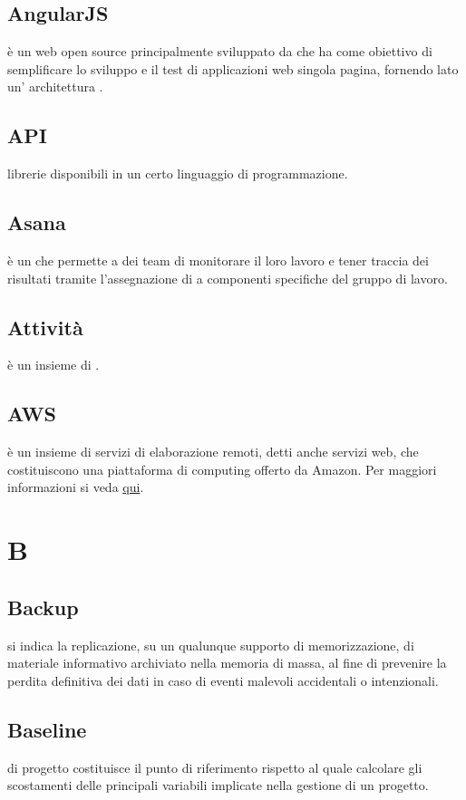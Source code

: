 \documentclass[12pt,a4paper]{article}
\begin{document}
\subsection{AngularJS}
è un  web open source principalmente sviluppato da  che ha come obiettivo di semplificare lo sviluppo e il test di applicazioni web singola pagina, fornendo lato  un' architettura .

\subsection{API}
librerie  disponibili in un certo linguaggio di programmazione.

\subsection{Asana}
è un  che permette a dei team di monitorare il loro lavoro e tener traccia dei risultati tramite l'assegnazione di  a componenti specifiche del gruppo di lavoro.

\subsection{Attività}
è un insieme di .

\subsection{AWS}
è un insieme di servizi di elaborazione remoti, detti anche servizi web, che costituiscono una piattaforma di computing offerto da Amazon. Per maggiori informazioni si veda \href{https://aws.amazon.com/it/}{qui}.


\newpage

\section{B}


\subsection{Backup}
si indica la replicazione, su un qualunque supporto di memorizzazione, di materiale informativo archiviato nella memoria di massa, al fine di prevenire la perdita definitiva dei dati in caso di eventi malevoli accidentali o intenzionali.

\subsection{Baseline}
 di progetto costituisce il punto di riferimento rispetto al quale calcolare gli scostamenti delle principali variabili implicate nella gestione di un progetto.
\end{document}
